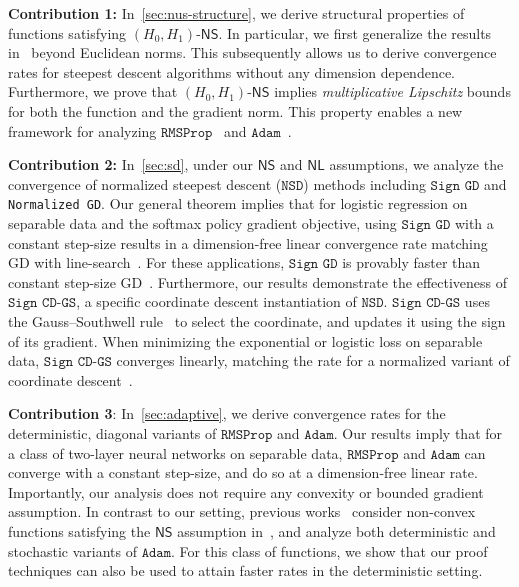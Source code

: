 \documentclass{article}
\newcommand{\NSD}{\texttt{NSD}}
\newcommand{\SignGD}{\texttt{Sign GD}}
\newcommand{\SignCD}{\texttt{Sign CD-GS}}
\newcommand{\RMS}{\texttt{RMSProp}}
\newcommand{\Adam}{\texttt{Adam}}
\newcommand{\NS}{\textsf{NS}}
\newcommand{\NL}{\textsf{NL}}
\begin{document}
\textbf{Contribution 1:} In~\cref{sec:nus-structure}, we derive structural properties of functions satisfying $(H_0, H_1)$-$\NS$. In particular, we first generalize the results in~\citet{vaswani2025armijo,alimisis2025we} beyond Euclidean norms. This subsequently allows us to derive convergence rates for steepest descent algorithms without any dimension dependence. Furthermore, we prove that $(H_0, H_1)$-$\NS$ implies \textit{multiplicative Lipschitz} bounds for both the function and the gradient norm. This property enables a new framework for analyzing $\RMS$~\citep{tieleman2012lecture} and $\Adam$~\citep{kingma2014adam}. 

\textbf{Contribution 2:} In~\cref{sec:sd}, under our $\NS$ and $\NL$ assumptions, we analyze the convergence of normalized steepest descent ($\NSD$) methods including $\SignGD$ and \texttt{Normalized GD}. Our general theorem implies that for logistic regression on separable data and the softmax policy gradient objective, using $\SignGD$ with a constant step-size results in a dimension-free linear convergence rate matching GD with line-search~\citep{vaswani2025armijo}. For these applications, $\SignGD$ is provably faster than constant step-size GD~\citep{mei2020global,wu2024large}. Furthermore, our results demonstrate the effectiveness of $\SignCD$, a specific coordinate descent instantiation of $\NSD$. $\SignCD$ uses the Gauss–Southwell rule~\citep{nutini2015coordinate} to select the coordinate, and updates it using the sign of its gradient. When minimizing the exponential or logistic loss on separable data, $\SignCD$ converges linearly, matching the rate for a normalized variant of coordinate descent~\citep{axiotis2023gradient}. 

\textbf{Contribution 3}: In~\cref{sec:adaptive}, we derive convergence rates for the deterministic, diagonal variants of $\RMS$ and $\Adam$. Our results imply that for a class of two-layer neural networks on separable data, $\RMS$ and $\Adam$ can converge with a constant step-size, and do so at a dimension-free linear rate. Importantly, our analysis does not require any convexity or bounded gradient assumption. In contrast to our setting, previous works~\citep{li2023convergence,wang2024convergence,wang2024provable} consider non-convex functions satisfying the $\NS$ assumption in~\citet{zhang2019gradient}, and analyze both deterministic and stochastic variants of $\Adam$. For this class of functions, we show that our proof techniques can also be used to attain faster rates in the deterministic setting.  
\end{document}
